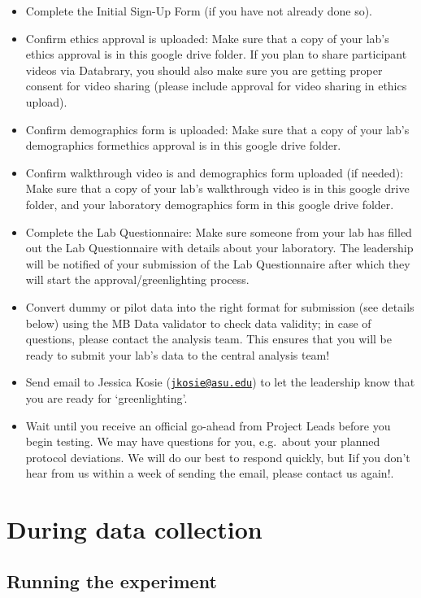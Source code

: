 \documentclass[
]{book}
\providecommand{\tightlist}{%
  \setlength{\itemsep}{0pt}\setlength{\parskip}{0pt}}
\begin{document}
\begin{itemize}
\tightlist
\item
  Complete the Initial Sign-Up Form (if you have not already done so).
\item
  Confirm ethics approval is uploaded: Make sure that a copy of your lab's ethics approval is in this google drive folder. If you plan to share participant videos via Databrary, you should also make sure you are getting proper consent for video sharing (please include approval for video sharing in ethics upload).
\item
  Confirm demographics form is uploaded: Make sure that a copy of your lab's demographics formethics approval is in this google drive folder.
\item
  Confirm walkthrough video is and demographics form uploaded (if needed): Make sure that a copy of your lab's walkthrough video is in this google drive folder, and your laboratory demographics form in this google drive folder.
\item
  Complete the Lab Questionnaire: Make sure someone from your lab has filled out the Lab Questionnaire with details about your laboratory. The leadership will be notified of your submission of the Lab Questionnaire after which they will start the approval/greenlighting process.
\item
  Convert dummy or pilot data into the right format for submission (see details below) using the MB Data validator to check data validity; in case of questions, please contact the analysis team. This ensures that you will be ready to submit your lab's data to the central analysis team!
\item
  Send email to Jessica Kosie (\href{mailto:jkosie@asu.edu}{\nolinkurl{jkosie@asu.edu}}) to let the leadership know that you are ready for `greenlighting'.
\item
  Wait until you receive an official go-ahead from Project Leads before you begin testing. We may have questions for you, e.g.~about your planned protocol deviations. We will do our best to respond quickly, but Iif you don't hear from us within a week of sending the email, please contact us again!.
\end{itemize}

\chapter{During data collection}\label{during-data-collection}

\section{Running the experiment}\label{running-the-experiment}
\end{document}
